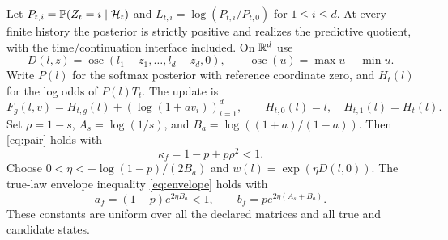 \begin{lemma}\label{lem:filter-raw}
Let $P_{t,i}=\mathbb P(Z_t=i\mid\mathcal H_t)$ and $L_{t,i}=\log(P_{t,i}/P_{t,0})$ for $1\le i\le d$. At every finite history the posterior is strictly positive and realizes the predictive quotient, with the time/continuation interface included. On $\mathbb R^d$ use
\begin{equation}\label{eq:osc-metric}
 D(l,z)=\operatorname{osc}(l_1-z_1,\ldots,l_d-z_d,0),
 \qquad \operatorname{osc}(u)=\max u-\min u.
\end{equation}
Write $P(l)$ for the softmax posterior with reference coordinate zero, and $H_t(l)$ for the log odds of $P(l)T_t$. The update is
\begin{equation}\label{eq:filter-update}
 F_g(l,v)=H_{t,g}(l)+(\log(1+av_i))_{i=1}^d,
 \qquad H_{t,0}(l)=l,\quad H_{t,1}(l)=H_t(l).
\end{equation}
Set $\rho=1-s$, $A_s=\log(1/s)$, and $B_a=\log((1+a)/(1-a))$. Then \eqref{eq:pair} holds with
\[
 \kappa_f=1-p+p\rho^2<1.
\]
Choose $0<\eta< -\log(1-p)/(2B_a)$ and $w(l)=\exp(\eta D(l,0))$. The true-law envelope inequality \eqref{eq:envelope} holds with
\begin{equation}\label{eq:filter-drift}
 a_f=(1-p)e^{2\eta B_a}<1,
 \qquad b_f=p e^{2\eta(A_s+B_a)}.
\end{equation}
These constants are uniform over all the declared matrices and all true and candidate states.
\end{lemma}
